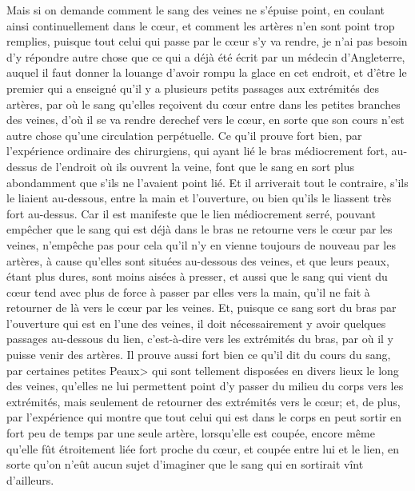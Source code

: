 \documentclass[french,twoside]{book} %
\begin{document}
Mais si on demande comment le sang des veines ne s'épuise point, en coulant ainsi continuellement dans le cœur, et comment les artères n'en sont point trop remplies, puisque tout celui qui passe par le cœur s'y va rendre, je n'ai pas besoin d'y répondre autre chose que ce qui a déjà été écrit par un médecin d'Angleterre, auquel il faut donner la louange d'avoir rompu la glace en cet endroit, et d'être le premier qui a enseigné qu'il y a plusieurs petits passages aux extrémités des artères, par où le sang qu'elles reçoivent du cœur entre dans les petites branches des veines, d'où il se va rendre derechef vers le cœur, en sorte que son cours n'est autre chose qu'une circulation perpétuelle. Ce qu'il prouve fort bien, par l'expérience ordinaire des chirurgiens, qui ayant lié le bras médiocrement fort, au-dessus de l'endroit où ils ouvrent la veine, font que le sang en sort plus abondamment que s'ils ne l'avaient point lié. Et il arriverait tout le contraire, s'ils le liaient au-dessous, entre la main et l'ouverture, ou bien qu'ils le liassent très fort au-dessus. Car il est manifeste que le lien médiocrement serré, pouvant empêcher que le sang qui est déjà dans le bras ne retourne vers le cœur par les veines, n'empêche pas pour cela qu'il n'y en vienne toujours de nouveau par les artères, à cause qu'elles sont situées au-dessous des veines, et que leurs peaux, étant plus dures, sont moins aisées à presser, et aussi que le sang qui vient du cœur tend avec plus de force à passer par elles vers la main, qu'il ne fait à retourner de là vers le cœur par les veines. Et, puisque ce sang sort du bras par l'ouverture qui est en l'une des veines, il doit nécessairement y avoir quelques passages au-dessous du lien, c'est-à-dire vers les extrémités du bras, par où il y puisse venir des artères. Il prouve aussi fort bien ce qu'il dit du cours du sang, par certaines petites Peaux> qui sont tellement disposées en divers lieux le long des veines, qu'elles ne lui permettent point d'y passer du milieu du corps vers les extrémités, mais seulement de retourner des extrémités vers le cœur; et, de plus, par l'expérience qui montre que tout celui qui est dans le corps en peut sortir en fort peu de temps par une seule artère, lorsqu'elle est coupée, encore même qu'elle fût étroitement liée fort proche du cœur, et coupée entre lui et le lien, en sorte qu'on n'eût aucun sujet d'imaginer que le sang qui en sortirait vînt d'ailleurs.\par
\end{document}
